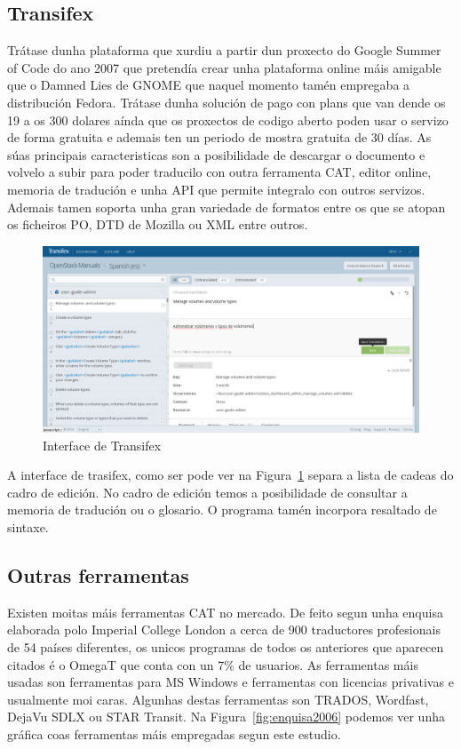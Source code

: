 \subsection{Transifex}
Trátase dunha plataforma que xurdiu a partir dun proxecto do Google Summer of Code do ano 2007 que pretendía crear unha plataforma online máis amigable que o Damned Lies de GNOME que naquel momento tamén empregaba a distribución Fedora. Trátase dunha solución de pago con plans que van dende os 19 a os 300 dolares aínda que os proxectos de codigo aberto poden usar o servizo de forma gratuita e ademais ten un periodo de mostra gratuita de 30 días. As súas principais caracteristicas son a posibilidade de descargar o documento e volvelo a subir para poder traducilo con outra ferramenta CAT, editor online, memoria de tradución e unha API que permite integralo con outros servizos. Ademais tamen soporta unha gran variedade de formatos entre os que se atopan os ficheiros PO, DTD de Mozilla ou XML entre outros.

\begin{figure}[h]
    \centering
    \includegraphics[width=\textwidth]{img/captura_transifex.png}
    \caption{Interface de Transifex}
    \label{fig:transifex}
\end{figure}

A interface de trasifex, como ser pode ver na Figura~\ref{fig:transifex} separa a lista de cadeas do cadro de edición. No cadro de edición temos a posibilidade de consultar a memoria de tradución ou o glosario. O programa tamén incorpora resaltado de sintaxe.

\subsection{Outras ferramentas}
Existen moitas máis ferramentas CAT no mercado. De feito segun unha enquisa \cite{article:2006survey} elaborada polo Imperial College London a cerca de 900 traductores profesionais de 54 países diferentes, os unicos programas de todos os anteriores que aparecen citados é o OmegaT que conta con un 7\% de usuarios. As ferramentas máis usadas son ferramentas para MS Windows e ferramentas con licencias privativas e usualmente moi caras. Algunhas destas ferramentas son TRADOS, Wordfast, DejaVu SDLX ou STAR Transit. Na Figura~\ref{fig:enquisa2006} podemos ver unha gráfica coas ferramentas máis empregadas segun este estudio.

